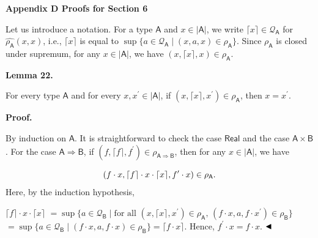  
 


 
\par\medskip\noindent\textbf{Appendix D Proofs for Section 6}\par
 
 
Let us introduce a notation. For a type $\mathsf{A}$ and $x\in|\mathsf{A}|$, we write $\lceil x\rceil\in\mathcal{Q}_{\mathsf{A}}$ for $\widehat{\rho_{\mathsf{A}}}(x,x)$, i.e., $\lceil x\rceil$ is equal to $\sup\{a\in\mathcal{Q}_{\mathsf{A}}\mid(x,a,x)\in\rho_{\mathsf{A}}\}.$ Since $\rho_{\mathsf{A}}$ is closed under supremum, for any $x\in|\mathsf{A}|$, we have $(x,\lceil x\rceil,x)\in\rho_{\mathsf{A}}$.\par
 
 
 
\par\medskip\noindent\textbf{Lemma 22.}\par
 
 
For every type $\mathsf{A}$ and for every $x,x^{\prime}\in|\mathsf{A}|$, if $(x,\lceil x\rceil,x^{\prime})\in\rho_{\mathsf{A}}$, then $x=x^{\prime}$.\par
 
 
 
 
\par\medskip\noindent\textbf{Proof.}\par
 
 
By induction on $\mathsf{A}$. It is straightforward to check the case $\mathsf{Real}$ and the case $\mathsf{A}\times\mathsf{B}$. For the case $\mathsf{A}\Rightarrow\mathsf{B}$, if $(f,\lceil f\rceil,f^{\prime})\in\rho_{\mathsf{A}\Rightarrow\mathsf{B}}$, then for any $x\in|\mathsf{A}|$, we have\par
    \[(f\cdot x,\lceil f\rceil\cdot x\cdot\lceil x\rceil,f^{\prime}\cdot x)\in\rho_{%
\mathsf{A}}.\]    
Here, by the induction hypothesis,\par
    $\displaystyle\lceil f\rceil\cdot x\cdot\lceil x\rceil$ $\displaystyle=\sup\{a\in\mathcal{Q}_{\mathsf{B}}\mid\text{for all }(x,\lceil x%
\rceil,x^{\prime})\in\rho_{\mathsf{A}},\,(f\cdot x,a,f\cdot x^{\prime})\in\rho%
_{\mathsf{B}}\}$      $\displaystyle=\sup\{a\in\mathcal{Q}_{\mathsf{B}}\mid(f\cdot x,a,f\cdot x)\in%
\rho_{\mathsf{B}}\}=\lceil f\cdot x\rceil.$    
Hence, $f^{\prime}\cdot x=f\cdot x$. $\hfill\blacktriangleleft$\par
 
